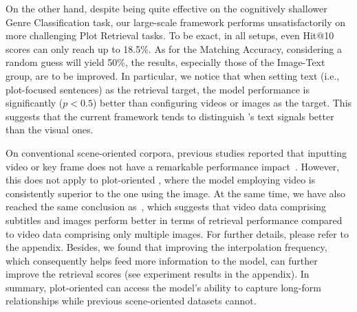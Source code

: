 On the other hand, despite being quite effective on the cognitively shallower Genre Classification task, our large-scale framework performs unsatisfactorily on more challenging Plot Retrieval tasks. To be exact, in all setups, even Hit@10 scores can only reach up to 18.5\%. As for the Matching Accuracy, considering a random guess will yield 50\%, the results, especially those of the Image-Text group, are to be improved. In particular, we notice that when setting text (i.e., plot-focused sentences) as the retrieval target, the model performance is significantly ($p<0.5$) better than configuring videos or images as the target. This suggests that the current framework tends to distinguish \TVD's text signals better than the visual ones.


On conventional scene-oriented corpora, previous studies reported that inputting video or key frame does not have a remarkable performance impact~\citep{keyframe2022revisiting}. However, this does not apply to plot-oriented \TVD, where the model employing video is consistently superior to the one using the image. At the same time, we have also reached the same conclusion as~\citep{lei2020tvr}, which suggests that video data comprising subtitles and images perform better in terms of retrieval performance compared to video data comprising only multiple images. For further details, please refer to the appendix. Besides, we found that improving the interpolation frequency, which consequently helps feed more information to the model, can further improve the retrieval scores  (see experiment results in the appendix). In summary, plot-oriented \TVD can access the model's ability to capture long-form relationships while previous scene-oriented datasets cannot.

